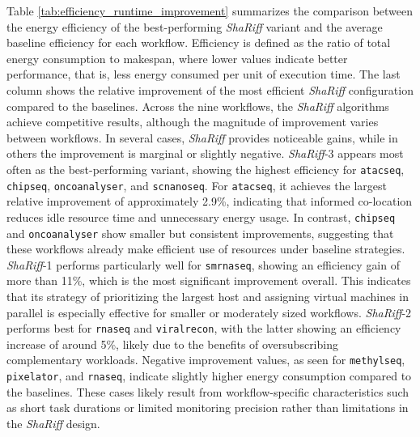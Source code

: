Table \ref{tab:efficiency_runtime_improvement} summarizes the comparison between the energy efficiency of the best-performing \textit{ShaRiff} variant and the average baseline efficiency for each workflow. Efficiency is defined as the ratio of total energy consumption to makespan, where lower values indicate better performance, that is, less energy consumed per unit of execution time. The last column shows the relative improvement of the most efficient \textit{ShaRiff} configuration compared to the baselines.
Across the nine workflows, the \textit{ShaRiff} algorithms achieve competitive results, although the magnitude of improvement varies between workflows. In several cases, \textit{ShaRiff} provides noticeable gains, while in others the improvement is marginal or slightly negative. \textit{ShaRiff}-3 appears most often as the best-performing variant, showing the highest efficiency for \texttt{atacseq}, \texttt{chipseq}, \texttt{oncoanalyser}, and \texttt{scnanoseq}. For \texttt{atacseq}, it achieves the largest relative improvement of approximately 2.9\%, indicating that informed co-location reduces idle resource time and unnecessary energy usage. In contrast, \texttt{chipseq} and \texttt{oncoanalyser} show smaller but consistent improvements, suggesting that these workflows already make efficient use of resources under baseline strategies.
\textit{ShaRiff}-1 performs particularly well for \texttt{smrnaseq}, showing an efficiency gain of more than 11\%, which is the most significant improvement overall. This indicates that its strategy of prioritizing the largest host and assigning virtual machines in parallel is especially effective for smaller or moderately sized workflows. \textit{ShaRiff}-2 performs best for \texttt{rnaseq} and \texttt{viralrecon}, with the latter showing an efficiency increase of around 5\%, likely due to the benefits of oversubscribing complementary workloads.
Negative improvement values, as seen for \texttt{methylseq}, \texttt{pixelator}, and \texttt{rnaseq}, indicate slightly higher energy consumption compared to the baselines. These cases likely result from workflow-specific characteristics such as short task durations or limited monitoring precision rather than limitations in the \textit{ShaRiff} design.

